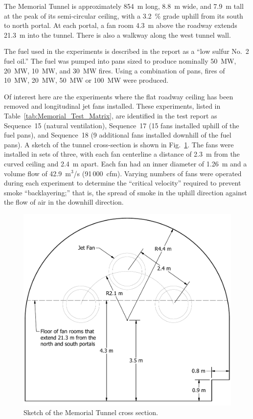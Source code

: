 The Memorial Tunnel is approximately 854~m long, 8.8~m wide, and 7.9~m tall at the peak of its semi-circular ceiling, with a 3.2~\% grade uphill from its south to north portal. At each portal, a fan room 4.3~m above the roadway extends 21.3~m into the tunnel. There is also a walkway along the west tunnel wall.

The fuel used in the experiments is described in the report as a ``low sulfur No.~2 fuel oil.'' The fuel was pumped into pans sized to produce nominally 50~MW, 20~MW, 10~MW, and 30~MW fires. Using a combination of pans, fires of 10~MW, 20~MW, 50~MW or 100~MW were produced.

Of interest here are the experiments where the flat roadway ceiling has been removed and longitudinal jet fans installed. These experiments, listed in Table~\ref{tab:Memorial_Test_Matrix}, are identified in the test report as Sequence~15 (natural ventilation), Sequence~17 (15 fans installed uphill of the fuel pans), and Sequence~18 (9 additional fans installed downhill of the fuel pans). A sketch of the tunnel cross-section is shown in Fig.~\ref{Memorial_Tunnel_Cross_Section}.  The fans were installed in sets of three, with each fan centerline a distance of 2.3~m from the curved ceiling and 2.4~m apart. Each fan had an inner diameter of 1.26~m and a volume flow of 42.9~m$^3$/s (91\,000~cfm). Varying numbers of fans were operated during each experiment to determine the ``critical velocity'' required to prevent smoke ``backlayering;'' that is, the spread of smoke in the uphill direction against the flow of air in the downhill direction. 

\begin{figure}[!ht]
\centering
\includegraphics[width=5in]{FIGURES/Memorial_Tunnel/section}
\caption[Memorial Tunnel cross section]{Sketch of the Memorial Tunnel cross section.}
\label{Memorial_Tunnel_Cross_Section}
\end{figure}

